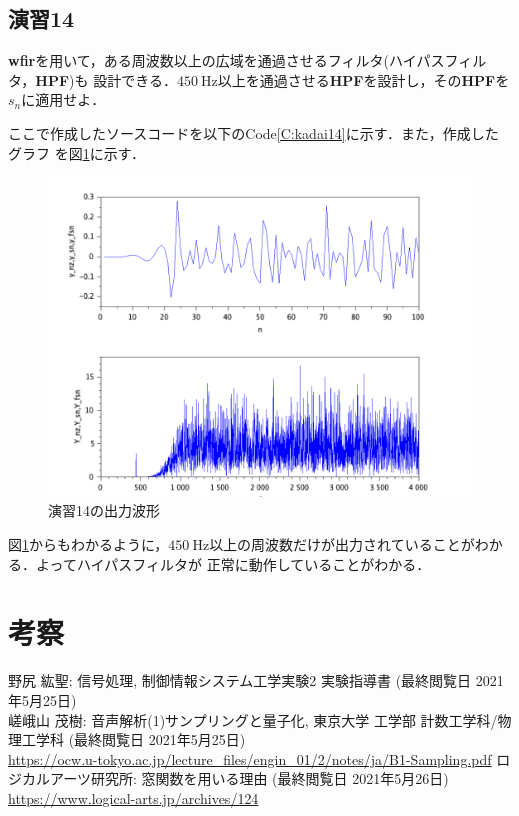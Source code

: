 \documentclass[a4paper,11pt]{jsarticle}
\begin{document}
  \subsection{演習14}
    \begin{screen}
      \textbf{wfir}を用いて，ある周波数以上の広域を通過させるフィルタ(ハイパスフィルタ，\textbf{HPF})も
      設計できる．$\SI{450}{\hertz}$以上を通過させる\textbf{HPF}を設計し，その\textbf{HPF}を$s_n$に適用せよ．
    \end{screen}
    ここで作成したソースコードを以下のCode\ref{C:kadai14}に示す．また，作成したグラフ
  を図\ref{G:kadai14}に示す．
  
  \begin{figure}[H]
    \centering
    \includegraphics[width=0.8\linewidth]{picture/kadai14.png}
    \caption{演習14の出力波形}
    \label{G:kadai14}
  \end{figure}
  図\ref{G:kadai14}からもわかるように，$\SI{450}{\hertz}$以上の周波数だけが出力されていることがわかる．よってハイパスフィルタが
  正常に動作していることがわかる．

\section{考察}

\begin{thebibliography}{99}
   野尻 紘聖: 信号処理, 制御情報システム工学実験2 実験指導書  (最終閲覧日 2021年5月25日)\\
   嵯峨山 茂樹: 音声解析(1)サンプリングと量子化, 東京大学 工学部 計数工学科/物理工学科 (最終閲覧日 2021年5月25日)\\ 
  \url{https://ocw.u-tokyo.ac.jp/lecture_files/engin_01/2/notes/ja/B1-Sampling.pdf}
   ロジカルアーツ研究所: 窓関数を用いる理由 (最終閲覧日 2021年5月26日) \\ \url{https://www.logical-arts.jp/archives/124}
\end{thebibliography}
\end{document}
